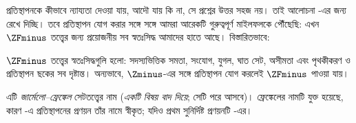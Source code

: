 \documentclass[../../../include/open-logic-section]{subfiles}
\begin{document}

প্রতিস্থাপনকে কীভাবে ন্যায্যতা দেওয়া যায়, আদৌ যায় কি না,
সে প্রশ্নের উত্তর সহজ নয়। তাই আলোচনা
-এর জন্য রেখে দিচ্ছি। তবে
প্রতিস্থাপন যোগ করার সঙ্গে সঙ্গে আমরা আরেকটি গুরুত্বপূর্ণ
মাইলফলকে পৌঁছেছি: এখন $\ZFminus$ তত্ত্বের জন্য প্রয়োজনীয়
সব স্বতঃসিদ্ধ আমাদের হাতে আছে। বিস্তারিতভাবে:

\begin{defn}
$\ZFminus$ তত্ত্বের স্বতঃসিদ্ধগুলি হলো: সদস্যভিত্তিক সমতা, সংযোগ,
যুগল, ঘাত সেট, অসীমতা এবং পৃথকীকরণ ও প্রতিস্থাপন
ছকের সব দৃষ্টান্ত। অন্যভাবে, $\Zminus$-এর সঙ্গে
প্রতিস্থাপন যোগ করলেই $\ZFminus$ পাওয়া যায়।
\end{defn}
\noindent
এটি \emph{জার্মেলো--ফ্রেঙ্কেল} সেটতত্ত্বের নাম
(\emph{একটি বিষয় বাদ দিয়ে}; সেটি পরে আসবে)।
ফ্রেঙ্কেলের নামটি যুক্ত হয়েছে, কারণ \citeyear{Fraenkel1922}-এ
প্রতিস্থাপনের প্রণয়ন তাঁর নামে স্বীকৃত; যদিও প্রথম
সুনির্দিষ্ট প্রণয়নটি \citet{Skolem1922}-এর।
\end{document}
